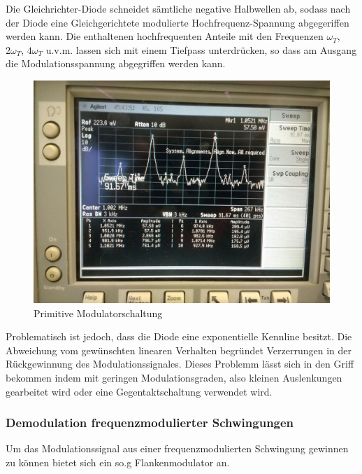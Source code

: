 Die Gleichrichter-Diode schneidet sämtliche negative Halbwellen ab, sodass nach der Diode eine Gleichgerichtete modulierte Hochfrequenz-Spannung abgegeriffen werden kann. Die enthaltenen hochfrequenten Anteile mit den Frequenzen $\omega_T$, $2\omega_T$,
$4\omega_T$ u.v.m. lassen sich mit einem Tiefpass unterdrücken, so dass am Ausgang die Modulationsspannung abgegriffen werden kann.

\begin{figure}
	\centering
	\includegraphics[width=\textwidth]{img/Aufgabenteil_b.jpg}
	\caption{Primitive Modulatorschaltung}
	\label{abb:ringMod}
\end{figure}

Problematisch ist jedoch, dass die Diode eine exponentielle Kennline besitzt. Die Abweichung vom gewünschten linearen Verhalten begründet Verzerrungen in der Rückgewinnung des Modulationssignales. Dieses Problemm lässt sich in den Griff bekommen indem mit geringen Modulationsgraden, also kleinen Auslenkungen gearbeitet wird oder eine Gegentaktschaltung verwendet wird.

\subsubsection{Demodulation frequenzmodulierter Schwingungen}
Um das Modulationssignal aus einer frequenzmodulierten Schwingung gewinnen zu können bietet sich ein so.g Flankenmodulator an.

